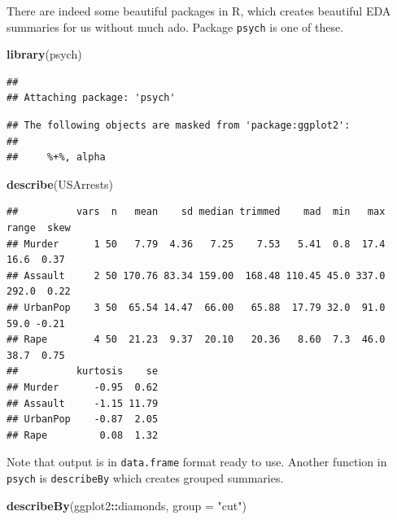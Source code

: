 \documentclass[
]{book}
\newenvironment{Shaded}{\begin{snugshade}}{\end{snugshade}}
\newcommand{\AttributeTok}[1]{\textcolor[rgb]{0.13,0.29,0.53}{#1}}
\newcommand{\FunctionTok}[1]{\textcolor[rgb]{0.13,0.29,0.53}{\textbf{#1}}}
\newcommand{\NormalTok}[1]{#1}
\newcommand{\SpecialCharTok}[1]{\textcolor[rgb]{0.81,0.36,0.00}{\textbf{#1}}}
\newcommand{\StringTok}[1]{\textcolor[rgb]{0.31,0.60,0.02}{#1}}
\begin{document}
There are indeed some beautiful packages in R, which creates beautiful EDA summaries for us without much ado. Package \texttt{psych} is one of these.

\begin{Shaded}
\begin{Highlighting}[]
\FunctionTok{library}\NormalTok{(psych)}
\end{Highlighting}
\end{Shaded}

\begin{verbatim}
## 
## Attaching package: 'psych'
\end{verbatim}

\begin{verbatim}
## The following objects are masked from 'package:ggplot2':
## 
##     %+%, alpha
\end{verbatim}

\begin{Shaded}
\begin{Highlighting}[]
\FunctionTok{describe}\NormalTok{(USArrests)}
\end{Highlighting}
\end{Shaded}

\begin{verbatim}
##          vars  n   mean    sd median trimmed    mad  min   max range  skew
## Murder      1 50   7.79  4.36   7.25    7.53   5.41  0.8  17.4  16.6  0.37
## Assault     2 50 170.76 83.34 159.00  168.48 110.45 45.0 337.0 292.0  0.22
## UrbanPop    3 50  65.54 14.47  66.00   65.88  17.79 32.0  91.0  59.0 -0.21
## Rape        4 50  21.23  9.37  20.10   20.36   8.60  7.3  46.0  38.7  0.75
##          kurtosis    se
## Murder      -0.95  0.62
## Assault     -1.15 11.79
## UrbanPop    -0.87  2.05
## Rape         0.08  1.32
\end{verbatim}

Note that output is in \texttt{data.frame} format ready to use. Another function in \texttt{psych} is \texttt{describeBy} which creates grouped summaries.

\begin{Shaded}
\begin{Highlighting}[]
\FunctionTok{describeBy}\NormalTok{(ggplot2}\SpecialCharTok{::}\NormalTok{diamonds, }\AttributeTok{group =} \StringTok{"cut"}\NormalTok{)}
\end{Highlighting}
\end{Shaded}
\end{document}
